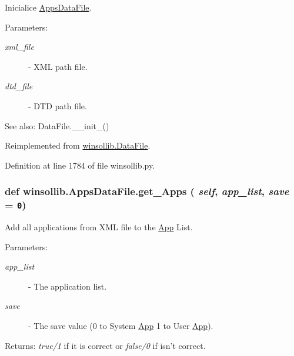 Inicialice \hyperlink{classwinsollib_1_1AppsDataFile}{Apps\-Data\-File}. 

\begin{Desc}
\item[Parameters:]
\begin{description}
\item[{\em xml\_\-file}]- XML path file. \item[{\em dtd\_\-file}]- DTD path file.\end{description}
\end{Desc}
\begin{Desc}
\item[See also:]Data\-File.\_\-\_\-init\_\-() \end{Desc}


Reimplemented from \hyperlink{classwinsollib_1_1DataFile_22c2b3c07b3991b6c2300719eccd9687}{winsollib.Data\-File}.

Definition at line 1784 of file winsollib.py.\hypertarget{classwinsollib_1_1AppsDataFile_17b0352842a241f33a0d597a0971a388}{
\subsubsection[get\_\-Apps]{\setlength{\rightskip}{0pt plus 5cm}def winsollib.Apps\-Data\-File.get\_\-Apps ( {\em self},  {\em app\_\-list},  {\em save} = {\tt 0})}}
\label{classwinsollib_1_1AppsDataFile_17b0352842a241f33a0d597a0971a388}


Add all applications from XML file to the \hyperlink{classwinsollib_1_1App}{App} List. 

\begin{Desc}
\item[Parameters:]
\begin{description}
\item[{\em app\_\-list}]- The application list. \item[{\em save}]- The save value (0 to System \hyperlink{classwinsollib_1_1App}{App} 1 to User \hyperlink{classwinsollib_1_1App}{App}). \end{description}
\end{Desc}
\begin{Desc}
\item[Returns:]{\em true/1\/} if it is correct or {\em false/0\/} if isn't correct. \end{Desc}


